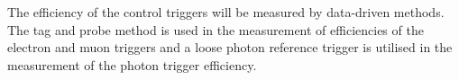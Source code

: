The efficiency of the control triggers will be measured by data-driven methods. The tag 
and probe method is used in the measurement of efficiencies of the electron and muon triggers 
and a loose photon reference trigger is utilised in the measurement of the photon trigger
efficiency.






